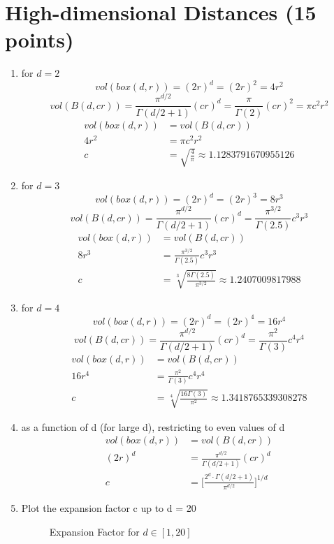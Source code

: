 \documentclass[11pt]{article}
\begin{document}
\section{High-dimensional Distances (15 points)}
\begin{enumerate}
\item for $d=2$\\
$$vol(box(d,r))=(2r)^d=(2r)^2=4r^2$$
$$vol(B(d,cr))=\frac{\pi^{d/2}}{\Gamma(d/2+1)}(cr)^d=\frac{\pi}{\Gamma(2)}(cr)^2=\pi c^2r^2$$
\begin{align*}
vol(box(d,r))&=vol(B(d,cr))\\
4r^2&=\pi c^2r^2\\
c&={\sqrt{\frac{4}{\pi}}}\approx1.1283791670955126
\end{align*}

\item for $d=3$\\
$$vol(box(d,r))=(2r)^d=(2r)^3=8r^3$$
$$vol(B(d,cr))=\frac{\pi^{d/2}}{\Gamma(d/2+1)}(cr)^d=\frac{\pi^{3/2}}{\Gamma(2.5)}c^3r^3$$
\begin{align*}
vol(box(d,r))&=vol(B(d,cr))\\
8r^3&=\frac{\pi^{3/2}}{\Gamma(2.5)}c^3r^3\\
c&=\sqrt[3]{\frac{8\Gamma(2.5)}{\pi^{3/2}}}\approx1.2407009817988
\end{align*}

\item for $d=4$\\
$$vol(box(d,r))=(2r)^d=(2r)^4=16r^4$$
$$vol(B(d,cr))=\frac{\pi^{d/2}}{\Gamma(d/2+1)}(cr)^d=\frac{\pi^2}{\Gamma(3)}c^4r^4$$
\begin{align*}
vol(box(d,r))&=vol(B(d,cr))\\
16r^4&=\frac{\pi^2}{\Gamma(3)}c^4r^4\\
c&=\sqrt[4]{\frac{16\Gamma(3)}{\pi^2}}\approx1.3418765339308278
\end{align*}

\item as a function of d (for large d), restricting to even values of d
\begin{align*}
vol(box(d,r))&=vol(B(d,cr))\\
(2r)^d&=\frac{\pi^{d/2}}{\Gamma(d/2+1)}(cr)^d\\
c&=\Big[\frac{2^d\cdot\Gamma(d/2+1)}{\pi^{d/2}}\Big]^{1/d}
\end{align*}

\item Plot the expansion factor c up to d = 20
\begin{figure}[H]
\caption{Expansion Factor for $d\in[1,20]$}
\label{fig:name}
\end{figure}
\end{enumerate}
\end{document}
